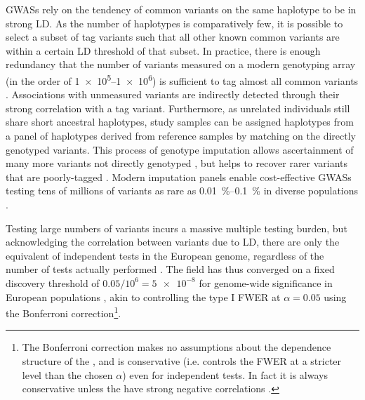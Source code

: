 \begin{outline}
\glspl{GWAS} rely on the tendency of common variants on the same haplotype to be in strong \gls{LD}.
As the number of haplotypes is comparatively few, 
it is possible to select a subset of tag variants such that all other known common variants are within a certain \gls{LD} threshold of that subset. 
In practice, there is enough redundancy that the number of variants measured on a modern genotyping array (in the order of \numrange[retain-unity-mantissa=false]{1e5}{1e6}) is sufficient to tag almost all common variants  \autocite{theinternationalhapmapconsortium2005HaplotypeMapHuman,barrett2006EvaluatingCoverageGenomewide}.
Associations with unmeasured variants are indirectly detected through their strong correlation with a tag variant.
Furthermore, as unrelated individuals still share short ancestral haplotypes, 
study samples can be assigned haplotypes from a panel of haplotypes derived from reference samples by matching on the directly genotyped variants.
This process of genotype imputation allows ascertainment of many more variants not directly genotyped \autocite{das2018GenotypeImputationLarge},
but helps to recover rarer variants that are poorly-tagged \autocite{visscher201710YearsGWAS}.
Modern imputation panels enable cost-effective \glspl{GWAS} testing tens of millions of variants as rare as \SIrange{0.01}{0.1}{\percent} in diverse populations \autocite{taliun2019Sequencing53831}.

Testing large numbers of variants incurs a massive multiple testing burden, but acknowledging the correlation between variants due to \gls{LD},
there are only the equivalent of  independent tests in the European genome, regardless of the number of tests actually performed \autocite{peer2008EstimationMultipleTesting}.
The field has thus converged on a fixed discovery threshold of $0.05 / 10^6 = \num{5e-8}$ for genome-wide significance in European populations \autocite{jannot2015108HasEmerged}, akin to controlling the type I \gls{FWER} at $\alpha = 0.05$ using the Bonferroni correction\footnote{
    The Bonferroni correction makes no assumptions about the dependence structure of the \pvalues{}, and is conservative (i.e. controls the \gls{FWER} at a stricter level than the chosen $\alpha$) even for independent tests. In fact it is always conservative unless the \pvalues{} have strong negative correlations \autocite{goeman2014MultipleHypothesisTesting}.
}.


\end{outline}
